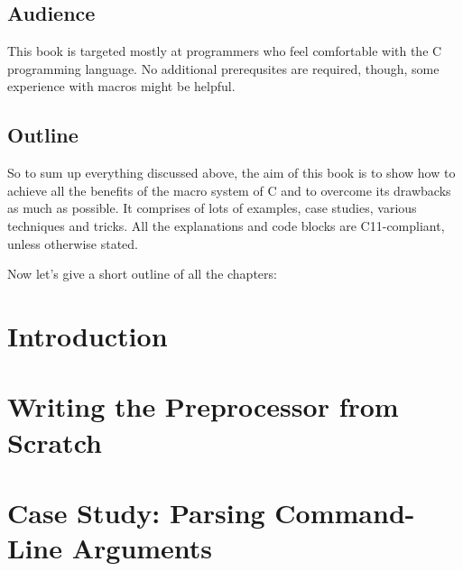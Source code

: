 \documentclass[a4paper, 12pt]{book}
\begin{document}
\newpage

\section{Audience}

This book is targeted mostly at programmers who feel comfortable with the C programming
language. No additional prerequsites are required, though, some experience with macros might
be helpful.

\newpage

\section{Outline}

So to sum up everything discussed above, the aim of this book is to show how to achieve all
the benefits of the macro system of C and to overcome its drawbacks as much as possible. It
comprises of lots of examples, case studies, various techniques and tricks. All the
explanations and code blocks are C11-compliant, unless otherwise stated.

Now let's give a short outline of all the chapters:

\newpage

\chapter{Introduction}
\chapter{Writing the Preprocessor from Scratch}
\chapter{Case Study: Parsing Command-Line Arguments}
\end{document}
